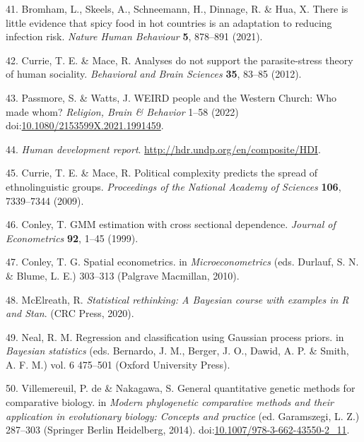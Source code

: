 \documentclass[english,man,floatsintext]{apa6}
\begin{document}
\leavevmode\hypertarget{ref-Bromham2021}{}%
41. Bromham, L., Skeels, A., Schneemann, H., Dinnage, R. \& Hua, X. There is little evidence that spicy food in hot countries is an adaptation to reducing infection risk. \emph{Nature Human Behaviour} \textbf{5}, 878--891 (2021).

\leavevmode\hypertarget{ref-Currie2012}{}%
42. Currie, T. E. \& Mace, R. Analyses do not support the parasite-stress theory of human sociality. \emph{Behavioral and Brain Sciences} \textbf{35}, 83--85 (2012).

\leavevmode\hypertarget{ref-Passmore2022}{}%
43. Passmore, S. \& Watts, J. WEIRD people and the Western Church: Who made whom? \emph{Religion, Brain \& Behavior} 1--58 (2022) doi:\href{https://doi.org/10.1080/2153599X.2021.1991459}{10.1080/2153599X.2021.1991459}.

\leavevmode\hypertarget{ref-hdi}{}%
44. \emph{Human development report}. \url{http://hdr.undp.org/en/composite/HDI}.

\leavevmode\hypertarget{ref-Currie2009}{}%
45. Currie, T. E. \& Mace, R. Political complexity predicts the spread of ethnolinguistic groups. \emph{Proceedings of the National Academy of Sciences} \textbf{106}, 7339--7344 (2009).

\leavevmode\hypertarget{ref-Conley1999}{}%
46. Conley, T. GMM estimation with cross sectional dependence. \emph{Journal of Econometrics} \textbf{92}, 1--45 (1999).

\leavevmode\hypertarget{ref-Conley2010}{}%
47. Conley, T. G. Spatial econometrics. in \emph{Microeconometrics} (eds. Durlauf, S. N. \& Blume, L. E.) 303--313 (Palgrave Macmillan, 2010).

\leavevmode\hypertarget{ref-McElreath2020}{}%
48. McElreath, R. \emph{Statistical rethinking: A Bayesian course with examples in R and Stan}. (CRC Press, 2020).

\leavevmode\hypertarget{ref-Neal1998}{}%
49. Neal, R. M. Regression and classification using Gaussian process priors. in \emph{Bayesian statistics} (eds. Bernardo, J. M., Berger, J. O., Dawid, A. P. \& Smith, A. F. M.) vol. 6 475--501 (Oxford University Press).

\leavevmode\hypertarget{ref-deVillemereuil2014}{}%
50. Villemereuil, P. de \& Nakagawa, S. General quantitative genetic methods for comparative biology. in \emph{Modern phylogenetic comparative methods and their application in evolutionary biology: Concepts and practice} (ed. Garamszegi, L. Z.) 287--303 (Springer Berlin Heidelberg, 2014). doi:\href{https://doi.org/10.1007/978-3-662-43550-2_11}{10.1007/978-3-662-43550-2\_11}.
\end{document}
